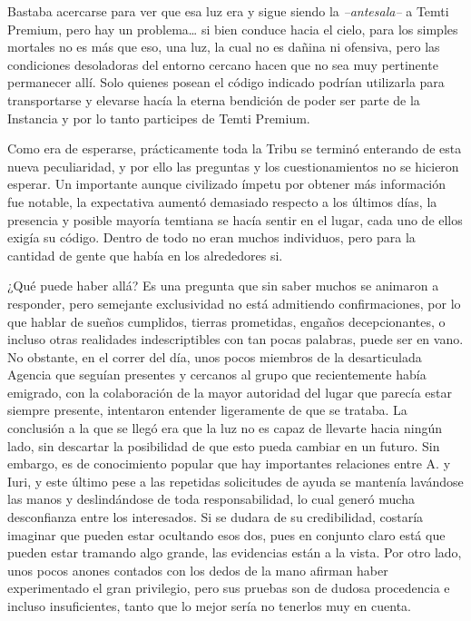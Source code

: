 \documentclass[
  spanish,
]{book}
\begin{document}
Bastaba acercarse para ver que esa luz era y sigue siendo la \emph{--antesala--} a Temti Premium, pero hay un problema\ldots{} si bien conduce hacia el cielo, para los simples mortales no es más que eso, una luz, la cual no es dañina ni ofensiva, pero las condiciones desoladoras del entorno cercano hacen que no sea muy pertinente permanecer allí. Solo quienes posean el código indicado podrían utilizarla para transportarse y elevarse hacía la eterna bendición de poder ser parte de la Instancia y por lo tanto participes de Temti Premium.

Como era de esperarse, prácticamente toda la Tribu se terminó enterando de esta nueva peculiaridad, y por ello las preguntas y los cuestionamientos no se hicieron esperar. Un importante aunque civilizado ímpetu por obtener más información fue notable, la expectativa aumentó demasiado respecto a los últimos días, la presencia y posible mayoría temtiana se hacía sentir en el lugar, cada uno de ellos exigía su código. Dentro de todo no eran muchos individuos, pero para la cantidad de gente que había en los alrededores si.

¿Qué puede haber allá?
Es una pregunta que sin saber muchos se animaron a responder, pero semejante exclusividad no está admitiendo confirmaciones, por lo que hablar de sueños cumplidos, tierras prometidas, engaños decepcionantes, o incluso otras realidades indescriptibles con tan pocas palabras, puede ser en vano. No obstante, en el correr del día, unos pocos miembros de la desarticulada Agencia que seguían presentes y cercanos al grupo que recientemente había emigrado, con la colaboración de la mayor autoridad del lugar que parecía estar siempre presente, intentaron entender ligeramente de que se trataba. La conclusión a la que se llegó era que la luz no es capaz de llevarte hacia ningún lado, sin descartar la posibilidad de que esto pueda cambiar en un futuro. Sin embargo, es de conocimiento popular que hay importantes relaciones entre A. y Iuri, y este último pese a las repetidas solicitudes de ayuda se mantenía lavándose las manos y deslindándose de toda responsabilidad, lo cual generó mucha desconfianza entre los interesados. Si se dudara de su credibilidad, costaría imaginar que pueden estar ocultando esos dos, pues en conjunto claro está que pueden estar tramando algo grande, las evidencias están a la vista.
Por otro lado, unos pocos anones contados con los dedos de la mano afirman haber experimentado el gran privilegio, pero sus pruebas son de dudosa procedencia e incluso insuficientes, tanto que lo mejor sería no tenerlos muy en cuenta.
\end{document}

